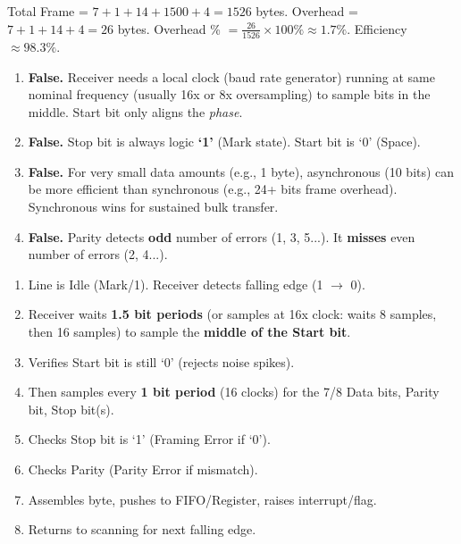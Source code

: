 \documentclass[11pt]{article}
\begin{document}
\begin{corrige}[Exercise 3]
Total Frame = $7 + 1 + 14 + 1500 + 4 = 1526$ bytes.
Overhead = $7 + 1 + 14 + 4 = 26$ bytes.
Overhead \% $= \frac{26}{1526} \times 100\% \approx \mathbf{1.7\%}$.
Efficiency $\approx \mathbf{98.3\%}$.
\end{corrige}

\begin{corrige}[Exercise 4]
\begin{enumerate}
    \item \textbf{False.} Receiver needs a local clock (baud rate generator) running at same nominal frequency (usually 16x or 8x oversampling) to sample bits in the middle. Start bit only aligns the \emph{phase}.
    \item \textbf{False.} Stop bit is always logic \textbf{`1'} (Mark state). Start bit is `0' (Space).
    \item \textbf{False.} For very small data amounts (e.g., 1 byte), asynchronous (10 bits) can be more efficient than synchronous (e.g., 24+ bits frame overhead). Synchronous wins for sustained bulk transfer.
    \item \textbf{False.} Parity detects \textbf{odd} number of errors (1, 3, 5...). It \textbf{misses} even number of errors (2, 4...).
\end{enumerate}
\end{corrige}

\begin{corrige}[Exercise 5]
\begin{enumerate}
    \item Line is Idle (Mark/1). Receiver detects falling edge (1 $\to$ 0).
    \item Receiver waits \textbf{1.5 bit periods} (or samples at 16x clock: waits 8 samples, then 16 samples) to sample the \textbf{middle of the Start bit}.
    \item Verifies Start bit is still `0' (rejects noise spikes).
    \item Then samples every \textbf{1 bit period} (16 clocks) for the 7/8 Data bits, Parity bit, Stop bit(s).
    \item Checks Stop bit is `1' (Framing Error if `0').
    \item Checks Parity (Parity Error if mismatch).
    \item Assembles byte, pushes to FIFO/Register, raises interrupt/flag.
    \item Returns to scanning for next falling edge.
\end{enumerate}
\end{corrige}
\end{document}
